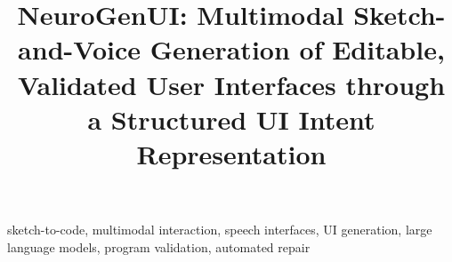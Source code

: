 \documentclass[conference]{IEEEtran}
\begin{document}
\title{NeuroGenUI: Multimodal Sketch-and-Voice Generation of Editable, Validated User Interfaces through a Structured UI Intent Representation}

\author{
}

\maketitle



\begin{IEEEkeywords}
sketch-to-code, multimodal interaction, speech interfaces, UI generation, large language models, program validation, automated repair
\end{IEEEkeywords}










\end{document}
